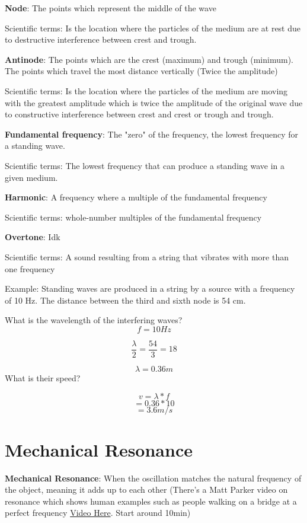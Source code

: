\documentclass[10pt]{article}
\begin{document}
\textbf{Node}: The points which represent the middle of the wave

Scientific terms: Is the location where the particles of the medium are
at rest due to destructive interference between crest and trough. 

\textbf{Antinode}: The points which are the crest (maximum) and trough (minimum). The points which travel the most distance vertically (Twice the amplitude)

Scientific terms: Is the location where the particles of the medium are moving with the greatest amplitude which is twice the amplitude of the original wave due to constructive interference between crest and crest or trough and trough.

\textbf{Fundamental frequency}: The "zero" of the frequency, the lowest frequency for a standing wave.

Scientific terms: The lowest frequency that can produce a standing wave in a given medium.


\textbf{Harmonic}: A frequency where a multiple of the fundamental frequency

Scientific terms: whole-number multiples of the fundamental frequency

\textbf{Overtone}: Idk

Scientific terms: A sound resulting from a string that vibrates with more than one frequency

Example:
Standing waves are produced in a string by a source with a frequency
of 10 Hz. The distance between the third and sixth node is 54 cm.

What is the wavelength of the interfering waves?
$$f=10Hz$$

$$\frac{\lambda}{2}=\frac{54}{3}=18$$

$$\lambda=0.36m$$
What is their speed?

$$v=\lambda*f$$
$$=0.36*10$$
$$=3.6m/s$$

\section{Mechanical Resonance}

\textbf{Mechanical Resonance}: When the oscillation matches the natural frequency of the object, meaning it adds up to each other (There's a Matt Parker video on resonance which shows human examples such as people walking on a bridge at a perfect frequency \href{https://www.youtube.com/watch?v=6JwEYamjXpA}{Video Here}. Start around 10min)
\end{document}
